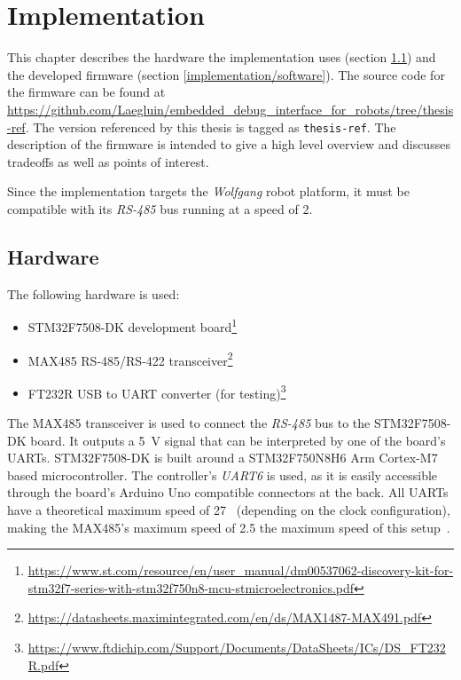 \chapter{Implementation}
\label{implementation}

This chapter describes the hardware the implementation uses (section \ref{implementation/hardware})
and the developed firmware (section \ref{implementation/software}). The source code for the firmware
can be found at \url{https://github.com/Laegluin/embedded_debug_interface_for_robots/tree/thesis-ref}.
The version referenced by this thesis is tagged as \lstinline{thesis-ref}. The description of the
firmware is intended to give a high level overview and discusses tradeoffs as well as points of
interest.

Since the implementation targets the \textit{Wolfgang} robot platform, it must be compatible with
its \textit{RS-485} bus running at a speed of \SI{2}{}.

\section{Hardware}
\label{implementation/hardware}

The following hardware is used:

\begin{itemize}
    \item STM32F7508-DK development board\footnote{\url{https://www.st.com/resource/en/user_manual/dm00537062-discovery-kit-for-stm32f7-series-with-stm32f750n8-mcu-stmicroelectronics.pdf}}
    \item MAX485 RS-485/RS-422 transceiver\footnote{\url{https://datasheets.maximintegrated.com/en/ds/MAX1487-MAX491.pdf}}
    \item FT232R USB to UART converter (for testing)\footnote{\url{https://www.ftdichip.com/Support/Documents/DataSheets/ICs/DS_FT232R.pdf}}
\end{itemize}

The MAX485 transceiver is used to connect the \textit{RS-485} bus to the STM32F7508-DK board. It
outputs a \SI{5}{\volt} signal that can be interpreted by one of the board's UARTs. STM32F7508-DK
is built around a STM32F750N8H6 Arm Cortex-M7 based microcontroller. The controller's \textit{UART6}
is used, as it is easily accessible through the board's Arduino Uno compatible connectors at the
back. All UARTs have a theoretical maximum speed of \SI{27}{}~\cite{mcu-ref-manual} (depending
on the clock configuration), making the MAX485's maximum speed of \SI{2.5}{} the maximum speed
of this setup~\cite{max-485-manual}\cite{board-user-manual}.

